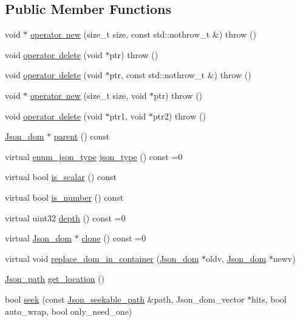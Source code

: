 \subsection*{Public Member Functions}
\begin{DoxyCompactItemize}
\item 
void $\ast$ \mbox{\hyperlink{classJson__dom_a7d1dd22b98e18d568cd5d506bc3e2d11}{operator new}} (size\+\_\+t size, const std\+::nothrow\+\_\+t \&)  throw ()
\item 
void \mbox{\hyperlink{classJson__dom_a43b780b9e249ce9caa177a433f2212f7}{operator delete}} (void $\ast$ptr)  throw ()
\item 
void \mbox{\hyperlink{classJson__dom_a0321897a695f0d68840c3df4e4286c39}{operator delete}} (void $\ast$ptr, const std\+::nothrow\+\_\+t \&)  throw ()
\item 
void $\ast$ \mbox{\hyperlink{classJson__dom_a5cd9c48436205d68c377489fbfeddbb0}{operator new}} (size\+\_\+t size, void $\ast$ptr)  throw ()
\item 
void \mbox{\hyperlink{classJson__dom_ada3ed296e9b3b6509fb2a539eb592473}{operator delete}} (void $\ast$ptr1, void $\ast$ptr2)  throw ()
\item 
\mbox{\hyperlink{classJson__dom}{Json\+\_\+dom}} $\ast$ \mbox{\hyperlink{classJson__dom_a0cd11e9bcf413aaf092fbf87a85d8dc4}{parent}} () const
\item 
virtual \mbox{\hyperlink{classJson__dom_af37eed7dfe1da1d6507d3ab85320eb03}{enum\+\_\+json\+\_\+type}} \mbox{\hyperlink{classJson__dom_aed953eca1e112aade66511ad1bbf82b8}{json\+\_\+type}} () const =0
\item 
virtual bool \mbox{\hyperlink{classJson__dom_a0288197126a1427a5f88fa8b94d6de3d}{is\+\_\+scalar}} () const
\item 
virtual bool \mbox{\hyperlink{classJson__dom_ab94257c625c7d77556fd3bf58c961187}{is\+\_\+number}} () const
\item 
virtual uint32 \mbox{\hyperlink{classJson__dom_a779b8c6ac78329409f8be12e6d082782}{depth}} () const =0
\item 
virtual \mbox{\hyperlink{classJson__dom}{Json\+\_\+dom}} $\ast$ \mbox{\hyperlink{classJson__dom_a03c529d590cc4cdb747ccb82f4b70fb5}{clone}} () const =0
\item 
virtual void \mbox{\hyperlink{classJson__dom_a310ec5cb1b04e112335a0bcfe510eac5}{replace\+\_\+dom\+\_\+in\+\_\+container}} (\mbox{\hyperlink{classJson__dom}{Json\+\_\+dom}} $\ast$oldv, \mbox{\hyperlink{classJson__dom}{Json\+\_\+dom}} $\ast$newv)
\item 
\mbox{\hyperlink{classJson__path}{Json\+\_\+path}} \mbox{\hyperlink{classJson__dom_a9de13701bd441f8eee2a778cf400a936}{get\+\_\+location}} ()
\item 
bool \mbox{\hyperlink{classJson__dom_adccfc76983f4efecc82a021b4707c198}{seek}} (const \mbox{\hyperlink{classJson__seekable__path}{Json\+\_\+seekable\+\_\+path}} \&path, Json\+\_\+dom\+\_\+vector $\ast$hits, bool auto\+\_\+wrap, bool only\+\_\+need\+\_\+one)
\end{DoxyCompactItemize}
